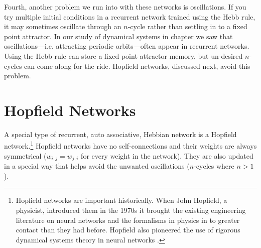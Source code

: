 Fourth, another problem we run into with these networks is oscillations. If you try multiple initial conditions in a recurrent network trained using the Hebb rule, it may sometimes oscillate through an $n$-cycle rather than settling in to a fixed point attractor. In our study of dynamical systems in chapter  we saw that oscillations---i.e. attracting periodic orbits---often appear in recurrent networks. Using the Hebb rule can store a fixed point attractor memory, but un-desired $n$-cycles can come along for the ride. Hopfield networks, discussed next, avoid this problem.



\section{Hopfield Networks}

A special type of recurrent, auto associative, Hebbian network is a Hopfield network.\footnote{Hopfield networks are important historically. When John Hopfield, a physicist, introduced them in the 1970s it brought the existing engineering literature on neural networks and the formalisms in physics in to greater contact than they had before. Hopfield also pioneered the use of rigorous dynamical systems theory in neural networks \cite{hopfield1982neural}.}  Hopfield networks have no self-connections and their weights are always symmetrical ($w_{i,j} = w_{j,i}$ for every weight in the network). They are also updated in a special way that helps avoid the unwanted oscillations ($n$-cycles where $n>1$).


